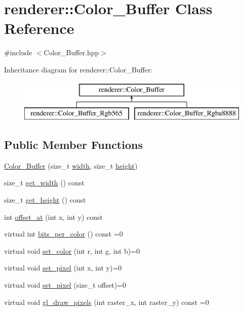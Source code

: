 \hypertarget{classrenderer_1_1_color___buffer}{}\section{renderer\+::Color\+\_\+\+Buffer Class Reference}
\label{classrenderer_1_1_color___buffer}


{\ttfamily \#include $<$Color\+\_\+\+Buffer.\+hpp$>$}

Inheritance diagram for renderer\+::Color\+\_\+\+Buffer\+:\begin{figure}[H]
\begin{center}
\leavevmode
\includegraphics[height=2.000000cm]{classrenderer_1_1_color___buffer}
\end{center}
\end{figure}
\subsection*{Public Member Functions}
\begin{DoxyCompactItemize}
\item 
\mbox{\hyperlink{classrenderer_1_1_color___buffer_a42e228a4ed403c292b22fe69e4f9e092}{Color\+\_\+\+Buffer}} (size\+\_\+t \mbox{\hyperlink{classrenderer_1_1_color___buffer_ace3fab0552b94a1d7d7afcc592cd4503}{width}}, size\+\_\+t \mbox{\hyperlink{classrenderer_1_1_color___buffer_a9a26f6f8e04447ac2b26c38e0a190714}{height}})
\item 
size\+\_\+t \mbox{\hyperlink{classrenderer_1_1_color___buffer_a719d5481887bcae92797f566b21d2b64}{get\+\_\+width}} () const
\item 
size\+\_\+t \mbox{\hyperlink{classrenderer_1_1_color___buffer_a75e5eddc9bc168ee6c65276b1e716047}{get\+\_\+height}} () const
\item 
int \mbox{\hyperlink{classrenderer_1_1_color___buffer_a899ad44fd4d44ffed9e0704f97e01daf}{offset\+\_\+at}} (int x, int y) const
\item 
virtual int \mbox{\hyperlink{classrenderer_1_1_color___buffer_ac03bd34681ed79f8b36c9c7292db98e4}{bits\+\_\+per\+\_\+color}} () const =0
\item 
virtual void \mbox{\hyperlink{classrenderer_1_1_color___buffer_ac99a897d15211d3754e343928412b765}{set\+\_\+color}} (int r, int g, int b)=0
\item 
virtual void \mbox{\hyperlink{classrenderer_1_1_color___buffer_a383c851cb75200d8924857b1b28a675e}{set\+\_\+pixel}} (int x, int y)=0
\item 
virtual void \mbox{\hyperlink{classrenderer_1_1_color___buffer_a02e8a2b93f5d95f10e2aedd24ee02625}{set\+\_\+pixel}} (size\+\_\+t offset)=0
\item 
virtual void \mbox{\hyperlink{classrenderer_1_1_color___buffer_a1108142247a2814d028b5ffbcde72d52}{gl\+\_\+draw\+\_\+pixels}} (int raster\+\_\+x, int raster\+\_\+y) const =0
\end{DoxyCompactItemize}
